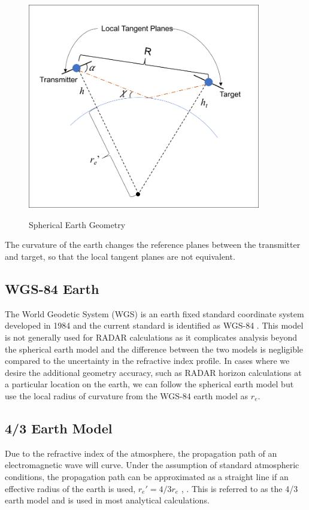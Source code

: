 \begin{figure}[H]
  \begin{center}
\includegraphics[width=4in]{../media/multistatic/spherical_earth_geometry.png}
  \end{center}
  \renewcommand{\baselinestretch}{1} \small\normalsize
  \begin{quote}
    \caption[Spherical Earth Geometry]{Spherical Earth Geometry\label{env_fig:2}}
  \end{quote}
\end{figure}
\renewcommand{\baselinestretch}{2} \small\normalsize
The curvature of the earth changes the reference planes between the transmitter and target, so that the local tangent planes are not equivalent.

\subsection{WGS-84 Earth}
The World Geodetic System (WGS) is an earth fixed standard coordinate system developed in 1984 and the current standard is identified as WGS-84 \cite{dod_wgs84}. This model is not generally used for RADAR calculations as it complicates analysis beyond the spherical earth model and the difference between the two models is negligible compared to the uncertainty in the refractive index profile. In cases where we desire the additional geometry accuracy, such as RADAR horizon calculations at a particular location on the earth, we can follow the spherical earth model but use the local radius of curvature from the WGS-84 earth model as $r_e$.

\subsection{4/3 Earth Model}
Due to the refractive index of the atmosphere, the propagation path of an electromagnetic wave will curve. Under the assumption of standard atmospheric conditions, the propagation path can be approximated as a straight line if an effective radius of the earth is used, $r_e' = 4/3 r_e$ \cite{blake_radar}, \cite{nathanson_radar}. This is referred to as the 4/3 earth model and is used in most analytical calculations.

